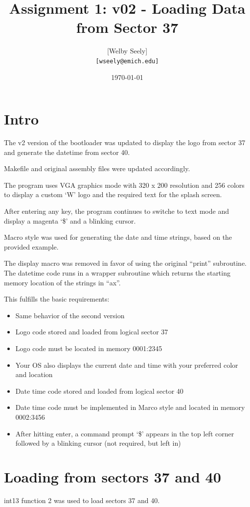 \documentclass{article}
\title{Assignment 1: v02 - Loading Data from Sector 37}
\author{
    [Welby Seely] \\
    \texttt{[wseely@emich.edu]}
}
\date{\today}
\begin{document}
    \maketitle
    \section{Intro}\label{sec:intro}
    The v2 version of the bootloader was updated to display the logo from sector 37 and generate the datetime from sector 40.

    Makefile and original assembly files were updated accordingly.

    The program uses VGA graphics mode with 320 x 200 resolution and 256 colors to display a
    custom `W' logo and the required text for the splash screen.

    After entering any key, the program continues to switche to text mode and display a magenta `\$' and a
    blinking cursor.

    Macro style was used for generating the date and time strings, based on the provided example.

    The display macro was removed in favor of using the original ``print'' subroutine.
     The datetime code runs in a wrapper subroutine which returns the starting memory location of the strings in ``ax''.

    This fulfills the basic requirements:

    \begin{itemize}
        \item Same behavior of the second version
        \item Logo code stored and loaded from logical sector 37
        \item Logo code must be located in memory 0001:2345
        \item Your OS also displays the current date and time with your preferred color and location
        \item Date time code stored and loaded from logical sector 40
        \item Date time code must be implemented in Marco style and located in memory 0002:3456
        \item After hitting enter, a command prompt `\$' appears in the top left corner followed by a blinking cursor (not required, but left in)
    \end{itemize}

    \section{Loading from sectors 37 and 40}\label{sec:reqs}
    int13 function 2 was used to load sectors 37 and 40.
\end{document}
